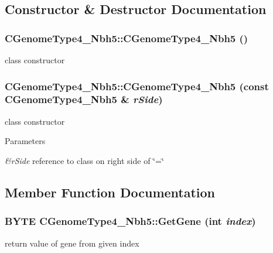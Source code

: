 \subsection{Constructor \& Destructor Documentation}
\hypertarget{classCGenomeType4__Nbh5_a96f7aa0a4c39d5ee4ae0004665f07703}{
\subsubsection[{CGenomeType4\_\-Nbh5}]{\setlength{\rightskip}{0pt plus 5cm}CGenomeType4\_\-Nbh5::CGenomeType4\_\-Nbh5 ()}}
\label{classCGenomeType4__Nbh5_a96f7aa0a4c39d5ee4ae0004665f07703}
class constructor \hypertarget{classCGenomeType4__Nbh5_a57c8c7a3a1b974aac79301a47099706f}{
\subsubsection[{CGenomeType4\_\-Nbh5}]{\setlength{\rightskip}{0pt plus 5cm}CGenomeType4\_\-Nbh5::CGenomeType4\_\-Nbh5 (const {\bf CGenomeType4\_\-Nbh5} \& {\em rSide})}}
\label{classCGenomeType4__Nbh5_a57c8c7a3a1b974aac79301a47099706f}
class constructor


\begin{DoxyParams}{Parameters}
\item[{\em \&rSide}]reference to class on right side of \char`\"{}=\char`\"{} \end{DoxyParams}


\subsection{Member Function Documentation}
\hypertarget{classCGenomeType4__Nbh5_adc99401e56d98f872bd63187f5f72dea}{
\subsubsection[{GetGene}]{\setlength{\rightskip}{0pt plus 5cm}BYTE CGenomeType4\_\-Nbh5::GetGene (int {\em index})}}
\label{classCGenomeType4__Nbh5_adc99401e56d98f872bd63187f5f72dea}
return value of gene from given index


